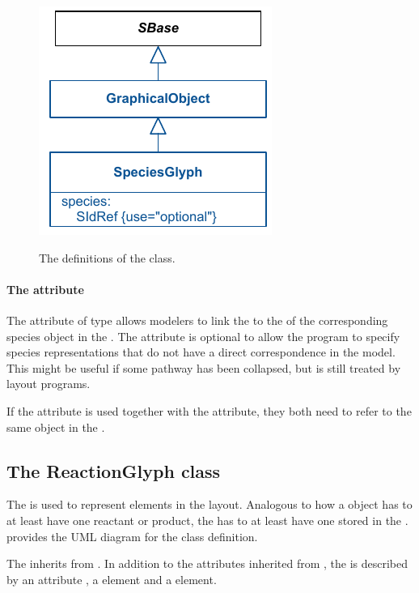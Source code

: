 \begin{figure}[!ht]
\includegraphics{uml/layout-speciesglyph-uml}\\
\caption{The definitions of the \SpeciesGlyph class.}
\label{uml:speciesglyph}
\end{figure}

\paragraph{The  attribute}
The  attribute of type  allows modelers 
to link the \SpeciesGlyph to the  of the corresponding species 
object in the \Model. The  attribute is optional to allow 
the program to specify species representations that do not have a direct 
correspondence in the model. This might be useful if some pathway has 
been collapsed, but is still treated by layout programs. 

If the  attribute is used together with the  attribute, 
they both need to refer to the same object in the \Model.

\subsection{The ReactionGlyph class}
\label{reactionglyph-class}
The \ReactionGlyph is used to represent \Reaction elements in the 
layout. Analogous to how a \Reaction object has to at least have one reactant 
or product, the \ReactionGlyph has to at least have one 
\SpeciesReferenceGlyph stored in the \ListOfSpeciesReferenceGlyphs. 
 provides the UML diagram for the class definition.

The \ReactionGlyph inherits from \GraphicalObject. In addition to the 
attributes inherited from \GraphicalObject, the \ReactionGlyph is 
described by an attribute , a \Curve element and a 
 element. 

